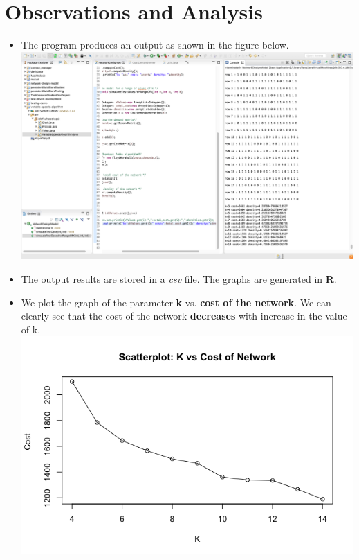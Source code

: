 \documentclass[12pt,letterpaper,titlepage,en-US]{article}
\begin{document}
\section{Observations and Analysis}
\begin{itemize}


\item The program produces an output as shown in the figure below.\\

 \includegraphics[scale=0.32]{fig/output.png}
 
\item The output results are stored in a \textit{csv} file. The graphs are generated in \textbf{R}.
\item We plot the graph of the parameter \textbf{k} vs. \textbf{cost of the network}. We can clearly see that the cost of the network \textbf{decreases} with increase in the value of k. \\
\includegraphics[scale=0.6]{fig/cost.png}


\end{itemize}
\end{document}
